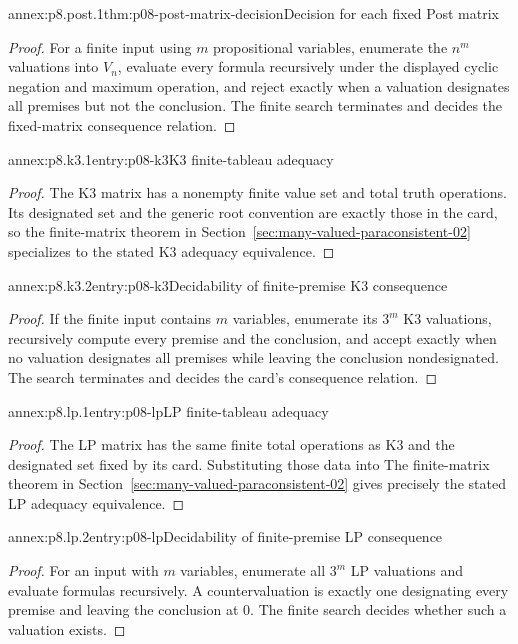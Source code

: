 \begin{annexitem}{annex:p8.post.1}{thm:p08-post-matrix-decision}{Decision for each fixed Post matrix}
\begin{proof}
For a finite input using \(m\) propositional variables, enumerate the
\(n^m\) valuations into \(V_n\), evaluate every formula recursively under the
displayed cyclic negation and maximum operation, and reject exactly when a
valuation designates all premises but not the conclusion.  The finite search
terminates and decides the fixed-matrix consequence relation.
\end{proof}
\end{annexitem}

\begin{annexitem}{annex:p8.k3.1}{entry:p08-k3}{K3 finite-tableau adequacy}
\begin{proof}
The K3 matrix has a nonempty finite value set and total truth operations.  Its
designated set and the generic root convention are exactly those in the card,
so the finite-matrix theorem in Section~\ref{sec:many-valued-paraconsistent-02} specializes to the stated K3
adequacy equivalence.
\end{proof}
\end{annexitem}

\begin{annexitem}{annex:p8.k3.2}{entry:p08-k3}{Decidability of finite-premise K3 consequence}
\begin{proof}
If the finite input contains \(m\) variables, enumerate its \(3^m\) K3
valuations, recursively compute every premise and the conclusion, and accept
exactly when no valuation designates all premises while leaving the conclusion
nondesignated.  The search terminates and decides the card's consequence
relation.
\end{proof}
\end{annexitem}

\begin{annexitem}{annex:p8.lp.1}{entry:p08-lp}{LP finite-tableau adequacy}
\begin{proof}
The LP matrix has the same finite total operations as K3 and the designated set
fixed by its card.  Substituting those data into
The finite-matrix theorem in Section~\ref{sec:many-valued-paraconsistent-02} gives precisely the stated LP
adequacy equivalence.
\end{proof}
\end{annexitem}

\begin{annexitem}{annex:p8.lp.2}{entry:p08-lp}{Decidability of finite-premise LP consequence}
\begin{proof}
For an input with \(m\) variables, enumerate all \(3^m\) LP valuations and
evaluate formulas recursively.  A countervaluation is exactly one designating
every premise and leaving the conclusion at \(0\).  The finite search decides
whether such a valuation exists.
\end{proof}
\end{annexitem}


